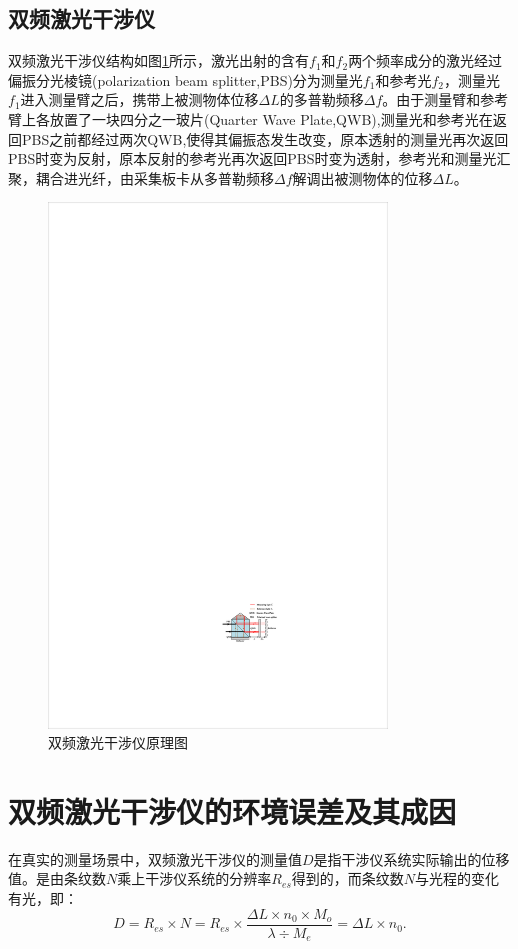 \subsection{双频激光干涉仪}
双频激光干涉仪结构如图\ref{fig:双频激光干涉仪原理图}所示，激光出射的含有\(f_1\)和\(f_2\)两个频率成分的激光经过偏振分光棱镜(polarization beam splitter,PBS)分为测量光\(f_1\)和参考光\(f_2\)，测量光\(f_1\)进入测量臂之后，携带上被测物体位移\(\Delta L\)的多普勒频移\(\Delta f\)。由于测量臂和参考臂上各放置了一块四分之一玻片(Quarter Wave Plate,QWB),测量光和参考光在返回PBS之前都经过两次QWB,使得其偏振态发生改变，原本透射的测量光再次返回PBS时变为反射，原本反射的参考光再次返回PBS时变为透射，参考光和测量光汇聚，耦合进光纤，由采集板卡从多普勒频移\(\Delta f\)解调出被测物体的位移\(\Delta L\)。
\begin{figure}[htb]
    \centering
    \includegraphics[width=9cm]{fig/2-fig/双频激光干涉仪原理图.pdf}
    \caption{双频激光干涉仪原理图}
    \label{fig:双频激光干涉仪原理图}
\end{figure}

\section{双频激光干涉仪的环境误差及其成因}
在真实的测量场景中，双频激光干涉仪的测量值\(D\)是指干涉仪系统实际输出的位移值。是由条纹数\(N\)乘上干涉仪系统的分辨率\(R_{es}\)得到的，而条纹数\(N\)与光程的变化有光，即：
\begin{equation}\label{eq:测量值与光程的关系}
    D=R_{es}{\times}N=R_{es}{\times}\frac{\Delta L{\times}n_0{\times}M_o}{\lambda{\div}M_e}=\Delta L{\times}n_0.
\end{equation}

